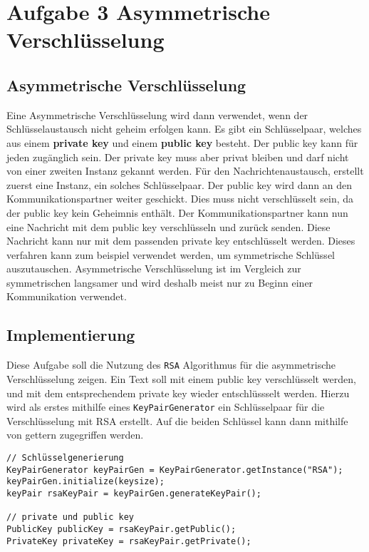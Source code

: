 \documentclass[12pt]{article}
\begin{document}
\section{Aufgabe 3 Asymmetrische Verschlüsselung}

\subsection{Asymmetrische Verschlüsselung}

Eine Asymmetrische Verschlüsselung wird dann verwendet, wenn der Schlüsselaustausch nicht geheim erfolgen kann. Es gibt ein Schlüsselpaar, welches aus einem \textbf{private key} und einem \textbf{public key} besteht. 
Der public key kann für jeden zugänglich sein. Der private key muss aber privat bleiben und darf nicht von einer zweiten Instanz gekannt werden. Für den Nachrichtenaustausch, erstellt zuerst eine Instanz, ein solches Schlüsselpaar. Der public key wird dann an den Kommunikationspartner weiter geschickt. Dies muss nicht verschlüsselt sein, da der public key kein Geheimnis enthält. Der Kommunikationspartner kann nun eine Nachricht mit dem public key verschlüsseln und zurück senden. Diese Nachricht kann nur mit dem passenden  private key entschlüsselt werden.
Dieses verfahren kann zum beispiel verwendet werden, um symmetrische Schlüssel auszutauschen. Asymmetrische Verschlüsselung ist im Vergleich zur symmetrischen langsamer und wird deshalb meist nur zu Beginn einer Kommunikation verwendet.

\subsection{Implementierung}

Diese Aufgabe soll die Nutzung des \texttt{RSA} Algorithmus für die asymmetrische Verschlüsselung zeigen. Ein Text soll mit einem public key verschlüsselt werden, und mit dem entsprechendem private key wieder entschlüssselt werden.
Hierzu wird als erstes mithilfe eines \texttt{KeyPairGenerator} ein Schlüsselpaar für die Verschlüsselung mit RSA erstellt. Auf die beiden Schlüssel kann dann mithilfe von gettern zugegriffen werden.

\begin{lstlisting}
// Schlüsselgenerierung
KeyPairGenerator keyPairGen = KeyPairGenerator.getInstance("RSA");
keyPairGen.initialize(keysize);
keyPair rsaKeyPair = keyPairGen.generateKeyPair();

// private und public key
PublicKey publicKey = rsaKeyPair.getPublic();
PrivateKey privateKey = rsaKeyPair.getPrivate();
\end{lstlisting}
\end{document}
